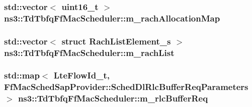 \subsubsection[{\texorpdfstring{m\+\_\+rach\+Allocation\+Map}{m_rachAllocationMap}}]{\setlength{\rightskip}{0pt plus 5cm}std\+::vector$<$ uint16\+\_\+t $>$ ns3\+::\+Td\+Tbfq\+Ff\+Mac\+Scheduler\+::m\+\_\+rach\+Allocation\+Map\hspace{0.3cm}{\ttfamily [private]}}\hypertarget{classns3_1_1TdTbfqFfMacScheduler_a09760afce6c2b248fbc5cbcffb9dede5}{}\label{classns3_1_1TdTbfqFfMacScheduler_a09760afce6c2b248fbc5cbcffb9dede5}
\subsubsection[{\texorpdfstring{m\+\_\+rach\+List}{m_rachList}}]{\setlength{\rightskip}{0pt plus 5cm}std\+::vector$<$ struct {\bf Rach\+List\+Element\+\_\+s} $>$ ns3\+::\+Td\+Tbfq\+Ff\+Mac\+Scheduler\+::m\+\_\+rach\+List\hspace{0.3cm}{\ttfamily [private]}}\hypertarget{classns3_1_1TdTbfqFfMacScheduler_a103dfe516b13e9ca8e0d1247c11b3679}{}\label{classns3_1_1TdTbfqFfMacScheduler_a103dfe516b13e9ca8e0d1247c11b3679}
\subsubsection[{\texorpdfstring{m\+\_\+rlc\+Buffer\+Req}{m_rlcBufferReq}}]{\setlength{\rightskip}{0pt plus 5cm}std\+::map$<$ {\bf Lte\+Flow\+Id\+\_\+t}, {\bf Ff\+Mac\+Sched\+Sap\+Provider\+::\+Sched\+Dl\+Rlc\+Buffer\+Req\+Parameters} $>$ ns3\+::\+Td\+Tbfq\+Ff\+Mac\+Scheduler\+::m\+\_\+rlc\+Buffer\+Req\hspace{0.3cm}{\ttfamily [private]}}\hypertarget{classns3_1_1TdTbfqFfMacScheduler_af1c1db8b8201f905faf17ce03f0369db}{}\label{classns3_1_1TdTbfqFfMacScheduler_af1c1db8b8201f905faf17ce03f0369db}
